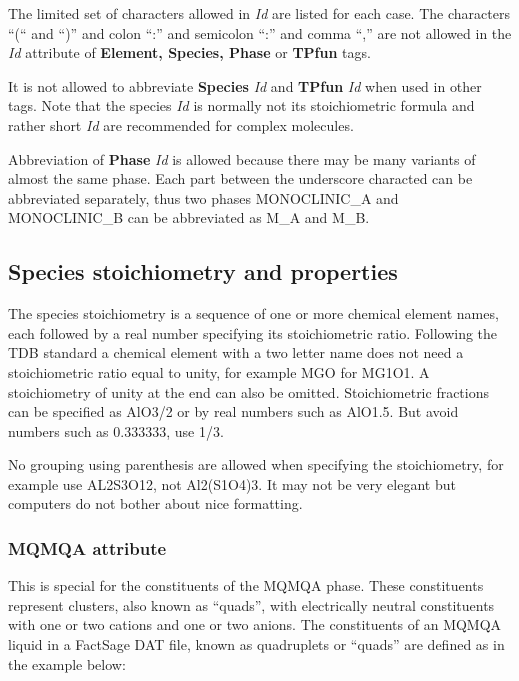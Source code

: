 \documentclass{article}
\begin{document}
The limited set of characters allowed in {\em Id} are listed for each
case.  The characters ``(`` and ``)'' and colon ``:'' and semicolon
``:'' and comma ``,'' are not allowed in the {\em Id} attribute of {\bf
  Element, Species, Phase} or {\bf TPfun} tags.

It is not allowed to abbreviate {\bf Species} {\em Id} and {\bf TPfun}
{\em Id} when used in other tags.  Note that the species {\em Id} is
normally not its stoichiometric formula and rather short {\em Id} are
recommended for complex molecules.

Abbreviation of {\bf Phase} {\em Id} is allowed because there may be
many variants of almost the same phase.  Each part between the
underscore characted can be abbreviated separately, thus two phases
MONOCLINIC\_A and MONOCLINIC\_B can be abbreviated as M\_A and M\_B.

\subsection{Species stoichiometry and properties}\label{sec:speciesSS}

The species stoichiometry is a sequence of one or more chemical
element names, each followed by a real number specifying its
stoichiometric ratio.  Following the TDB standard a chemical element
with a two letter name does not need a stoichiometric ratio equal to
unity, for example MGO for MG1O1.  A stoichiometry of unity at the end
can also be omitted.  Stoichiometric fractions can be specified as
AlO3/2 or by real numbers such as AlO1.5.  But avoid numbers such as
0.333333, use 1/3.

No grouping using parenthesis are allowed when specifying the
stoichiometry, for example use AL2S3O12, not Al2(S1O4)3.  It may not
be very elegant but computers do not bother about nice formatting.

\subsubsection{MQMQA attribute}\label{sec:mqmqa}

This is special for the constituents of the MQMQA phase.  These
constituents represent clusters, also known as ``quads'', with
electrically neutral constituents with one or two cations and one or
two anions.  The constituents of an MQMQA liquid in a FactSage DAT
file, known as quadruplets or ``quads'' are defined as in the example
below:
\end{document}
